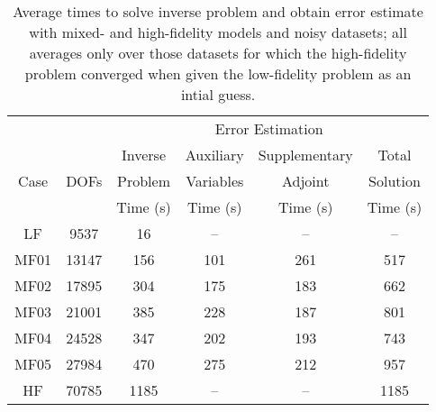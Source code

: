 \begin{table}
\caption{Average times to solve inverse problem and obtain error estimate with mixed- and high-fidelity models and noisy datasets; all averages only over those datasets for which the high-fidelity problem converged when given the low-fidelity problem as an intial guess.}
\centering
\begin{tabular}{ccc|c|c|c}
\cline{4-5} 
 & & & \multicolumn{2}{|c|}{Error Estimation} & \\
\cline{1-6}
\multicolumn{1}{|c|}{\multirow{3}{*}{Case}} & \multicolumn{1}{|c|}{\multirow{3}{*}{DOFs}} & Inverse & Auxiliary & Supplementary & \multicolumn{1}{|c|}{Total} \\
\multicolumn{1}{|c|}{} & \multicolumn{1}{|c|}{} & Problem & Variables & Adjoint & \multicolumn{1}{|c|}{Solution}\\
\multicolumn{1}{|c|}{} & \multicolumn{1}{|c|}{} & Time (s) &  Time (s) & Time (s) & \multicolumn{1}{|c|}{Time (s)}\\
\cline{1-6}
\multicolumn{1}{|c|}{LF}    & \multicolumn{1}{|c|}{9537}   & 16   & --  & -- & \multicolumn{1}{|c|}{--} \\ \hline
\multicolumn{1}{|c|}{MF01}  & \multicolumn{1}{|c|}{13147}  & 156  & 101 & 261 & \multicolumn{1}{|c|}{517} \\ \hline
\multicolumn{1}{|c|}{MF02}  & \multicolumn{1}{|c|}{17895}  & 304  & 175 & 183 & \multicolumn{1}{|c|}{662} \\ \hline
\multicolumn{1}{|c|}{MF03}  & \multicolumn{1}{|c|}{21001}  & 385  & 228 & 187 & \multicolumn{1}{|c|}{801} \\ \hline
\multicolumn{1}{|c|}{MF04}  & \multicolumn{1}{|c|}{24528}  & 347  & 202 & 193 & \multicolumn{1}{|c|}{743} \\ \hline
\multicolumn{1}{|c|}{MF05}  & \multicolumn{1}{|c|}{27984}  & 470  & 275 & 212 & \multicolumn{1}{|c|}{957} \\ \hline
\multicolumn{1}{|c|}{HF}    & \multicolumn{1}{|c|}{70785}  & 1185 & --  & --  & \multicolumn{1}{|c|}{1185} \\ \hline
\end{tabular}
\end{table}
%

